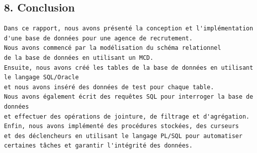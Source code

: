 \documentclass[a4paper,12pt]{article}
\begin{document}
\subsection*{8.  Conclusion}
\begin{verbatim}
Dans ce rapport, nous avons présenté la conception et l'implémentation d'une base de données pour une agence de recrutement.
Nous avons commencé par la modélisation du schéma relationnel 
de la base de données en utilisant un MCD.
Ensuite, nous avons créé les tables de la base de données en utilisant le langage SQL/Oracle
et nous avons inséré des données de test pour chaque table.
Nous avons également écrit des requêtes SQL pour interroger la base de données 
et effectuer des opérations de jointure, de filtrage et d'agrégation.
Enfin, nous avons implémenté des procédures stockées, des curseurs 
et des déclencheurs en utilisant le langage PL/SQL pour automatiser certaines tâches et garantir l'intégrité des données.
\end{verbatim}
\end{document}
